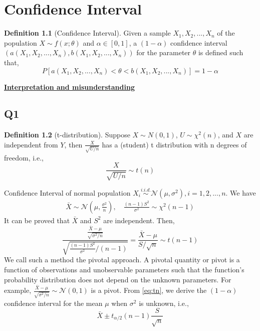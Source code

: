 \documentclass[
]{book}
\theoremstyle{definition}
\newtheorem{definition}{Definition}[chapter]
\theoremstyle{definition}
\theoremstyle{definition}
\theoremstyle{remark}
\begin{document}
\hypertarget{confidence-interval}{%
\chapter{Confidence Interval}\label{confidence-interval}}

\begin{definition}[Confidence Interval]
\protect\hypertarget{def:unnamed-chunk-4}{}{\label{def:unnamed-chunk-4} \iffalse (Confidence Interval) \fi{} }Given a sample \(X_1,X_2,...,X_n\) of the population \(X\sim f(x;\theta)\) and \(\alpha\in[0,1]\), a \((1-\alpha)\) confidence interval \(\left(a(X_1,X_2,...,X_n), b(X_1,X_2,...,X_n)\right)\) for the parameter \(\theta\) is defined such that,
\begin{equation}
P\left[a(X_1,X_2,...,X_n)< \theta <b(X_1,X_2,...,X_n)\right] = 1-\alpha
\end{equation}
\end{definition}

\textbf{\href{https://en.wikipedia.org/wiki/Confidence_interval\#Meaning_and_interpretation}{Interpretation and misunderstanding}}

\hypertarget{q1-2}{%
\section{Q1}\label{q1-2}}

\begin{definition}[t-distribution]
\protect\hypertarget{def:unnamed-chunk-5}{}{\label{def:unnamed-chunk-5} \iffalse (t-distribution) \fi{} }Suppose \(X\sim N(0, 1)\), \(U\sim \chi^2(n)\), and \(X\) are independent from \(Y\), then
\(\frac{X}{\sqrt{U/n}}\) has a (student) t distribution with n degrees of freedom, i.e.,
\[
  \frac{X}{\sqrt{U/n}} \sim t(n)
\]
\end{definition}

Confidence Interval of normal population \(X_i\stackrel{i.i.d.}\sim \mathcal{N}(\mu,\sigma^2),i=1,2,...,n\). We have
\begin{align}
\bar X \sim \mathcal{N}(\mu,\frac{\sigma^2}{n}), \quad \frac{(n-1)S^2}{\sigma^2}\sim \chi^2(n-1)
\end{align}
It can be proved that \(\bar X\) and \(S^2\) are independent. Then,
\begin{equation}
\frac{\frac{\bar X - \mu}{\sqrt{\sigma^2/n}}}{\sqrt{\frac{(n-1)S^2}{\sigma^2} / (n-1)}} = \frac{\bar X -\mu}{S/\sqrt{n}}\sim t(n-1)
\label{eq:tn}
\end{equation}
We call such a method the pivotal approach. A pivotal quantity or pivot is a function of observations and unobservable parameters such that the function's probability distribution does not depend on the unknown parameters. For example, \(\frac{\bar X - \mu}{\sqrt{\sigma^2/n}}\sim \mathcal{N}(0,1)\) is a pivot. From \eqref{eq:tn}, we derive the \((1-\alpha)\) confidence interval for the mean \(\mu\) when \(\sigma^2\) is unknown, i.e.,
\begin{equation}
\bar X \pm t_{\alpha/2}(n-1)\frac{S}{\sqrt{n}}
\end{equation}
\end{document}
